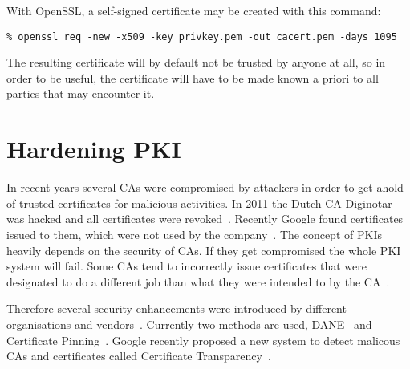 With OpenSSL, a self-signed certificate may be created with this command:

\begin{lstlisting}
% openssl req -new -x509 -key privkey.pem -out cacert.pem -days 1095
\end{lstlisting}

The resulting certificate will by default not be trusted by anyone at all,
so in order to be useful, the certificate will have to be made known a
priori to all parties that may encounter it.


\section{Hardening PKI}
\label{sec:hardeningpki}
In recent years several CAs were compromised by attackers in order to
get ahold of trusted certificates for malicious activities. In 2011 
the Dutch CA Diginotar was hacked and all certificates were
revoked~\cite{diginotar-hack}. Recently Google found certificates
issued to them, which were not used by the
company~\cite{googlecahack}. The concept of PKIs heavily depends on the
security of CAs.  If they get compromised the whole PKI system will
fail. Some CAs tend to incorrectly issue certificates that were designated
to do a different job than what they were intended to by the CA~\cite{gocode}.

Therefore several security enhancements were introduced by different
organisations and vendors~\cite{tschofenig-webpki}. Currently two
methods are used, DANE~\cite{rfc6698} and Certificate
Pinning~\cite{draft-ietf-websec-key-pinning}. Google recently proposed
a new system to detect malicous CAs and certificates  called Certificate 
Transparency~\cite{certtransparency}.






